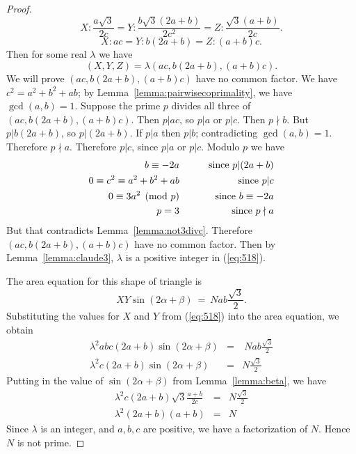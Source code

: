 \documentclass{amsart}
\theoremstyle{plain}
\theoremstyle{definition}
\theoremstyle{remark}
\begin{document}
\begin{proof}
$$ X: \frac {a \sqrt 3}{2c} = Y:\frac {b \sqrt 3 (2a+b)}{2c^2} = Z: \frac{\sqrt 3 (a+b)}{2c}.$$
$$ X: ac = Y : b(2a+b) = Z: (a+b)c.$$
Then for some real $\lambda$ we have
\begin{equation}
 (X,Y,Z) = \lambda (ac, b(2a+b), (a+b)c). \label{eq:518}
 \end{equation}
We will prove $(ac,b(2a+b),(a+b)c)$ have no common factor. 
We have $c^2 = a^2 + b^2 + ab$; by Lemma~\ref{lemma:pairwisecoprimality},
we have $\gcd(a,b) = 1$. 
Suppose the prime $p$ divides all three of $(ac,b(2a+b),(a+b)c)$.
  Then $p | ac$, so 
$p | a$ or $p | c$.  Then $p \nmid b$.  But $p | b(2a+b)$,
so $p | (2a+b)$.  If $p | a$ then $p | b$; contradicting $\gcd(a,b) = 1$. 
Therefore $p \nmid a$. Therefore $p | c$, since $p | a$ or $p | c$. 
Modulo $p$ we have
\begin{eqnarray*}
b \equiv -2a   && \mbox{\qquad since $p | (2a+b)$}\\
0 \equiv c^2 \equiv a^2 + b^2 + ab && \mbox{\qquad since $p | c$}\\
0  \equiv 3a^2 \pmod p  && \mbox{\qquad since $b \equiv -2a$}\\
p = 3                && \mbox{\qquad since $p \nmid a$}\\
\end{eqnarray*}
But that contradicts Lemma~\ref{lemma:not3divc}.
Therefore $(ac,b(2a+b),(a+b)c)$ have no common factor. 
Then by Lemma~\ref{lemma:claude3}, $\lambda$ is a positive integer in (\ref{eq:518}).

The area equation for this shape of triangle is 
$$ XY \sin (2\alpha+\beta) \ = \ N ab \frac {\sqrt 3} 2.$$
Substituting the values for $X$ and $Y$ from (\ref{eq:518}) into the area equation,
we obtain
\begin{eqnarray*}
\lambda^2 abc(2a+b) \sin(2\alpha+\beta) &=& \ N ab \frac {\sqrt 3} 2  \\
\lambda^2 c(2a+b) \sin(2\alpha+\beta)  &=& N \frac {\sqrt 3} 2  
\end{eqnarray*}
Putting in the value of $\sin(2\alpha+\beta)$ from Lemma~\ref{lemma:beta}, we have
\begin{eqnarray*}
\lambda^2 c(2a+b) \sqrt 3 \frac {a+b}{2c}  &=& N \frac {\sqrt 3} 2  \\
\lambda^2 (2a+b) (a+b)  &=& N 
\end{eqnarray*}
Since $\lambda$ is an integer, and $a,b,c$ are positive, we have a factorization of $N$.
Hence $N$ is not prime.
\end{proof}
\end{document}
